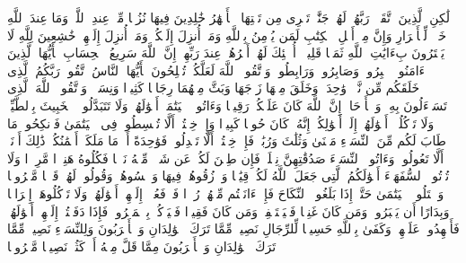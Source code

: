 \stopbuffer
\startbuffer[\q:3:198]
لَٰكِنِ ٱلَّذِینَ ٱتَّقَوۡا۟ رَبَّهُمۡ لَهُمۡ جَنَّٰتࣱ تَجۡرِی مِن تَحۡتِهَا ٱلۡأَنۡهَٰرُ خَٰلِدِینَ فِیهَا نُزُلࣰا مِّنۡ عِندِ ٱللَّهِۗ وَمَا عِندَ ٱللَّهِ خَیۡرࣱ لِّلۡأَبۡرَارِ%
\stopbuffer
\startbuffer[\q:3:199]
وَإِنَّ مِنۡ أَهۡلِ ٱلۡكِتَٰبِ لَمَن یُؤۡمِنُ بِٱللَّهِ وَمَاۤ أُنزِلَ إِلَیۡكُمۡ وَمَاۤ أُنزِلَ إِلَیۡهِمۡ خَٰشِعِینَ لِلَّهِ لَا یَشۡتَرُونَ بِءَایَٰتِ ٱللَّهِ ثَمَنࣰا قَلِیلًاۚ أُو۟لَٰۤئِكَ لَهُمۡ أَجۡرُهُمۡ عِندَ رَبِّهِمۡۗ إِنَّ ٱللَّهَ سَرِیعُ ٱلۡحِسَابِ%
\stopbuffer
\startbuffer[\q:3:200]
یَٰۤأَیُّهَا ٱلَّذِینَ ءَامَنُوا۟ ٱصۡبِرُوا۟ وَصَابِرُوا۟ وَرَابِطُوا۟ وَٱتَّقُوا۟ ٱللَّهَ لَعَلَّكُمۡ تُفۡلِحُونَ%
\stopbuffer
\startbuffer[\q:4:1]
یَٰۤأَیُّهَا ٱلنَّاسُ ٱتَّقُوا۟ رَبَّكُمُ ٱلَّذِی خَلَقَكُم مِّن نَّفۡسࣲ وَٰحِدَةࣲ وَخَلَقَ مِنۡهَا زَوۡجَهَا وَبَثَّ مِنۡهُمَا رِجَالࣰا كَثِیرࣰا وَنِسَاۤءࣰۚ وَٱتَّقُوا۟ ٱللَّهَ ٱلَّذِی تَسَاۤءَلُونَ بِهِۦ وَٱلۡأَرۡحَامَۚ إِنَّ ٱللَّهَ كَانَ عَلَیۡكُمۡ رَقِیبࣰا%
\stopbuffer
\startbuffer[\q:4:2]
وَءَاتُوا۟ ٱلۡیَتَٰمَىٰۤ أَمۡوَٰلَهُمۡۖ وَلَا تَتَبَدَّلُوا۟ ٱلۡخَبِیثَ بِٱلطَّیِّبِۖ وَلَا تَأۡكُلُوۤا۟ أَمۡوَٰلَهُمۡ إِلَىٰۤ أَمۡوَٰلِكُمۡۚ إِنَّهُۥ كَانَ حُوبࣰا كَبِیرࣰا%
\stopbuffer
\startbuffer[\q:4:3]
وَإِنۡ خِفۡتُمۡ أَلَّا تُقۡسِطُوا۟ فِی ٱلۡیَتَٰمَىٰ فَٱنكِحُوا۟ مَا طَابَ لَكُم مِّنَ ٱلنِّسَاۤءِ مَثۡنَىٰ وَثُلَٰثَ وَرُبَٰعَۖ فَإِنۡ خِفۡتُمۡ أَلَّا تَعۡدِلُوا۟ فَوَٰحِدَةً أَوۡ مَا مَلَكَتۡ أَیۡمَٰنُكُمۡۚ ذَٰلِكَ أَدۡنَىٰۤ أَلَّا تَعُولُوا۟%
\stopbuffer
\startbuffer[\q:4:4]
وَءَاتُوا۟ ٱلنِّسَاۤءَ صَدُقَٰتِهِنَّ نِحۡلَةࣰۚ فَإِن طِبۡنَ لَكُمۡ عَن شَیۡءࣲ مِّنۡهُ نَفۡسࣰا فَكُلُوهُ هَنِیۤءࣰا مَّرِیۤءࣰا%
\stopbuffer
\startbuffer[\q:4:5]
وَلَا تُؤۡتُوا۟ ٱلسُّفَهَاۤءَ أَمۡوَٰلَكُمُ ٱلَّتِی جَعَلَ ٱللَّهُ لَكُمۡ قِیَٰمࣰا وَٱرۡزُقُوهُمۡ فِیهَا وَٱكۡسُوهُمۡ وَقُولُوا۟ لَهُمۡ قَوۡلࣰا مَّعۡرُوفࣰا%
\stopbuffer
\startbuffer[\q:4:6]
وَٱبۡتَلُوا۟ ٱلۡیَتَٰمَىٰ حَتَّىٰۤ إِذَا بَلَغُوا۟ ٱلنِّكَاحَ فَإِنۡ ءَانَسۡتُم مِّنۡهُمۡ رُشۡدࣰا فَٱدۡفَعُوۤا۟ إِلَیۡهِمۡ أَمۡوَٰلَهُمۡۖ وَلَا تَأۡكُلُوهَاۤ إِسۡرَافࣰا وَبِدَارًا أَن یَكۡبَرُوا۟ۚ وَمَن كَانَ غَنِیࣰّا فَلۡیَسۡتَعۡفِفۡۖ وَمَن كَانَ فَقِیرࣰا فَلۡیَأۡكُلۡ بِٱلۡمَعۡرُوفِۚ فَإِذَا دَفَعۡتُمۡ إِلَیۡهِمۡ أَمۡوَٰلَهُمۡ فَأَشۡهِدُوا۟ عَلَیۡهِمۡۚ وَكَفَىٰ بِٱللَّهِ حَسِیبࣰا%
\stopbuffer
\startbuffer[\q:4:7]
لِّلرِّجَالِ نَصِیبࣱ مِّمَّا تَرَكَ ٱلۡوَٰلِدَانِ وَٱلۡأَقۡرَبُونَ وَلِلنِّسَاۤءِ نَصِیبࣱ مِّمَّا تَرَكَ ٱلۡوَٰلِدَانِ وَٱلۡأَقۡرَبُونَ مِمَّا قَلَّ مِنۡهُ أَوۡ كَثُرَۚ نَصِیبࣰا مَّفۡرُوضࣰا%
\stopbuffer
